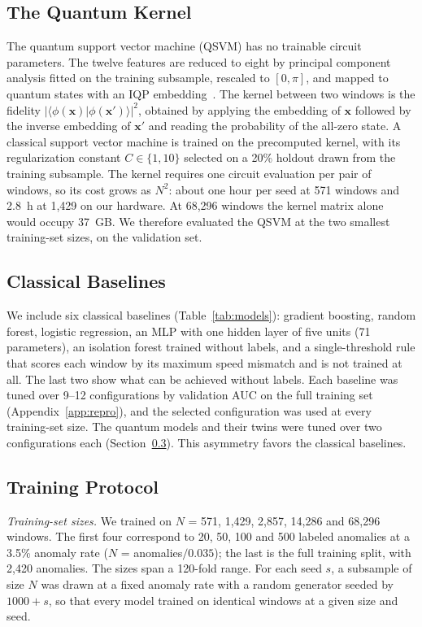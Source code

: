 \documentclass[journal]{IEEEtran}
\begin{document}
\subsection{The Quantum Kernel}
The quantum support vector machine (QSVM) has no trainable circuit parameters.
The twelve features are reduced to eight by principal component analysis fitted
on the training subsample, rescaled to $[0,\pi]$, and mapped to quantum states
with an IQP embedding~\cite{havlicek2019supervised}. The kernel between two
windows is the fidelity $|\langle\phi(\mathbf{x})|\phi(\mathbf{x}')\rangle|^2$,
obtained by applying the embedding of $\mathbf{x}$ followed by the inverse
embedding of $\mathbf{x}'$ and reading the probability of the all-zero state. A
classical support vector machine is trained on the precomputed kernel, with its
regularization constant $C\in\{1, 10\}$ selected on a 20\% holdout drawn from
the training subsample. The kernel requires one circuit evaluation per pair of
windows, so its cost grows as $N^2$: about one hour per seed at 571 windows and
2.8~h at 1,429 on our hardware. At 68,296 windows the kernel matrix alone would
occupy 37~GB. We therefore evaluated the QSVM at the two smallest training-set
sizes, on the validation set.

\subsection{Classical Baselines}
We include six classical baselines (Table~\ref{tab:models}): gradient boosting,
random forest, logistic regression, an MLP with one hidden layer of five units
(71 parameters), an isolation forest trained without labels, and a
single-threshold rule that scores each window by its maximum speed mismatch and
is not trained at all. The last two show what can be achieved without labels.
Each baseline was tuned over 9--12 configurations by validation AUC on the full
training set (Appendix~\ref{app:repro}), and the selected configuration was used
at every training-set size. The quantum models and their twins were tuned over
two configurations each (Section~\ref{sec:training}). This asymmetry favors the
classical baselines.

\subsection{Training Protocol}
\label{sec:training}
\textit{Training-set sizes.} We trained on $N$ = 571, 1,429, 2,857, 14,286 and
68,296 windows. The first four correspond to 20, 50, 100 and 500 labeled
anomalies at a 3.5\% anomaly rate ($N$ = anomalies$/0.035$); the last is the
full training split, with 2,420 anomalies. The sizes span a 120-fold range. For
each seed $s$, a subsample of size $N$ was drawn at a fixed anomaly rate with a
random generator seeded by $1000+s$, so that every model trained on identical
windows at a given size and seed.
\end{document}
